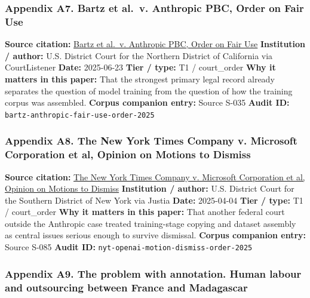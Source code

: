 \documentclass[
  american,
  11pt,
  letterpaper,
]{article}
\begin{document}
\subsubsection{Appendix A7. Bartz et al.~v. Anthropic PBC, Order on Fair
Use}\label{ch-04-appendix-a7-bartz-et-al-v-anthropic-pbc-order-on-fair-use}

\textbf{Source citation:}
\href{https://storage.courtlistener.com/recap/gov.uscourts.cand.434709/gov.uscourts.cand.434709.231.0_3.pdf}{Bartz
et al.~v. Anthropic PBC, Order on Fair Use} \textbf{Institution /
author:} U.S. District Court for the Northern District of California via
CourtListener \textbf{Date:} 2025-06-23 \textbf{Tier / type:} T1 /
court\_order \textbf{Why it matters in this paper:} That the strongest
primary legal record already separates the question of model training
from the question of how the training corpus was assembled.
\textbf{Corpus companion entry:} Source S-035 \textbf{Audit ID:}
\texttt{bartz-anthropic-fair-use-order-2025}

\subsubsection{Appendix A8. The New York Times Company v. Microsoft
Corporation et al, Opinion on Motions to
Dismiss}\label{ch-04-appendix-a8-the-new-york-times-company-v-microsoft-corporation-et-al-opinion-on-motions-to-dismiss}

\textbf{Source citation:}
\href{https://cases.justia.com/federal/district-courts/new-york/nysdce/1\%3A2023cv11195/612697/514/0.pdf?ts=1743868265}{The
New York Times Company v. Microsoft Corporation et al, Opinion on
Motions to Dismiss} \textbf{Institution / author:} U.S. District Court
for the Southern District of New York via Justia \textbf{Date:}
2025-04-04 \textbf{Tier / type:} T1 / court\_order \textbf{Why it
matters in this paper:} That another federal court outside the Anthropic
case treated training-stage copying and dataset assembly as central
issues serious enough to survive dismissal. \textbf{Corpus companion
entry:} Source S-085 \textbf{Audit ID:}
\texttt{nyt-openai-motion-dismiss-order-2025}

\subsubsection{Appendix A9. The problem with annotation. Human labour
and outsourcing between France and
Madagascar}\label{ch-04-appendix-a9-the-problem-with-annotation-human-labour-and-outsourcing-between-france-and-madagascar}
\end{document}
